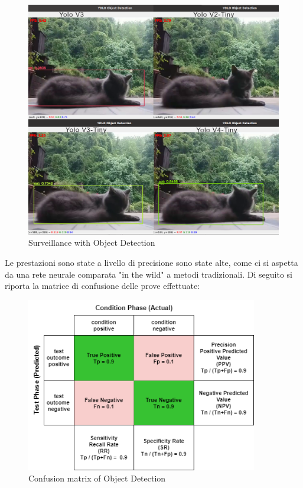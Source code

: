     \begin{figure}[H]
        \caption{Surveillance with Object Detection}
        \label{fig:ODcomparison}
        \centering
        \includegraphics[width=1\textwidth]{Images/ODcomparison.png}
    \end{figure}
    
    Le prestazioni sono state a livello di precisione sono state alte, come ci si aspetta da una rete neurale comparata "in the wild" a metodi tradizionali. Di seguito si riporta la matrice di confusione delle prove effettuate:
    
    \begin{figure}[H]
        \caption{Confusion matrix of Object Detection}
        \label{fig:ODmatrix}
        \centering
        \includegraphics[width=0.9\textwidth]{DrawIo/ConfusionMatrixObjDet.png}
    \end{figure}